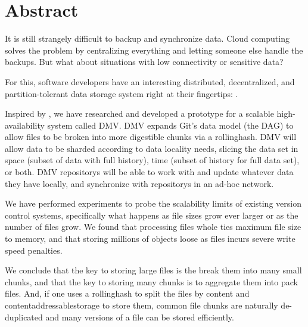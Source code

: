 \chapter{Abstract}

\glsunsetall
{}


It is still strangely difficult to backup and synchronize data. Cloud computing
solves the problem by centralizing everything and letting someone else handle
the backups. But what about situations with low connectivity or sensitive data?


For this, software developers have an interesting distributed, decentralized,
and partition-tolerant data storage system right at their fingertips:
.


Inspired by , we have researched and
developed a prototype for a scalable high-availability system called \gls{DMV}.
\gls{DMV} expands Git's data model (the \acrshort{DAG}) to allow files to be
broken into more digestible chunks via a \gls{rollinghash}. \gls{DMV} will allow
data to be sharded according to data locality needs, slicing the data set in
space (subset of data with full history), time (subset of history for full data
set), or both. \gls{DMV} \glspl{repository} will be able to work with and update
whatever data they have locally, and synchronize with \glspl{repository} in an
ad-hoc network.


We have performed experiments to probe the scalability limits of existing
version control systems, specifically what happens as file sizes grow ever
larger or as the number of files grow. We found that processing files whole
ties
maximum file size to memory, and that storing millions of objects loose as files
incurs severe write speed penalties.





We conclude that the key to storing large files is the break them into many
small chunks, and that the key to storing many chunks is to aggregate them into
pack files. And, if one uses a \gls{rollinghash} to split the files by content
and \gls{contentaddressablestorage} to store them, common file chunks are
naturally de-duplicated and many versions of a file can be stored efficiently.

%


\glsresetall
